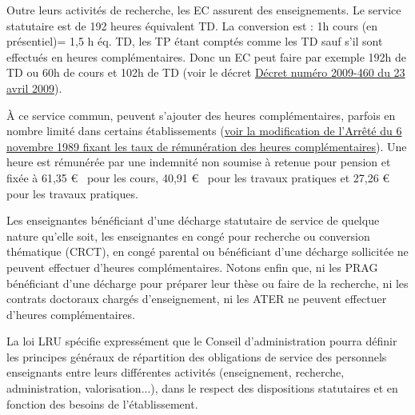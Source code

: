 Outre leurs activit\'es de recherche, les EC assurent des enseignements. Le service statutaire est de 192 heures \og \'equivalent TD\fg{}. 
La conversion est : 1h cours (en pr\'esentiel)= 1,5 h \'eq. TD, les TP \'etant compt\'es comme les TD sauf s'il sont effectu\'es en heures compl\'ementaires. Donc un EC peut faire par exemple 192h de TD ou 60h de cours et 102h de TD 
(voir le d\'ecret \href{http://www.legifrance.gouv.fr/affichTexte.do?cidTexte=JORFTEXT000020552216&dateTexte=&categorieLien=id}{D\'ecret num\'ero 2009-460 du 23 avril 2009}).


\`A ce service commun, peuvent s'ajouter des heures
compl\'ementaires, parfois en nombre limit\'e dans certains \'etablissements (\href{http://www.legifrance.gouv.fr/affichTexte.do?cidTexte=JORFTEXT000000315917&dateTexte=20121122}{voir la modification de l'Arr\^et\'e du 6 novembre 1989 fixant les taux de r\'emun\'eration des heures compl\'ementaires}). Une heure est r\'emun\'er\'ee par une indemnit\'e non soumise \`a retenue pour pension et fix\'ee \`a 61,35 \euro~ pour les cours, 40,91 \euro~ pour les travaux pratiques et 27,26 \euro~ pour les travaux pratiques.


Les enseignant\mp e\mp s b\'en\'eficiant d'une d\'echarge statutaire de service de quelque
nature qu'elle soit, les enseignant\mp e\mp s en cong\'e pour recherche ou
conversion th\'ematique (CRCT), en cong\'e parental ou b\'en\'eficiant d'une
d\'echarge sollicit\'ee ne peuvent effectuer d'heures
compl\'ementaires. Notons enfin
que, ni les PRAG b\'en\'eficiant d'une d\'echarge pour
pr\'eparer leur th\`ese ou faire de la recherche,
ni les contrats doctoraux charg\'es d'enseignement,
ni les ATER ne peuvent effectuer d'heures compl\'ementaires.

La loi LRU sp\'ecifie express\'ement que le Conseil
d'administration pourra d\'efinir les principes g\'en\'eraux de
r\'epartition des obligations de service des personnels enseignants
entre leurs diff\'erentes activit\'es (enseignement, recherche,
administration, valorisation...), dans le respect des dispositions
statutaires et en fonction des besoins de l'\'etablissement.

